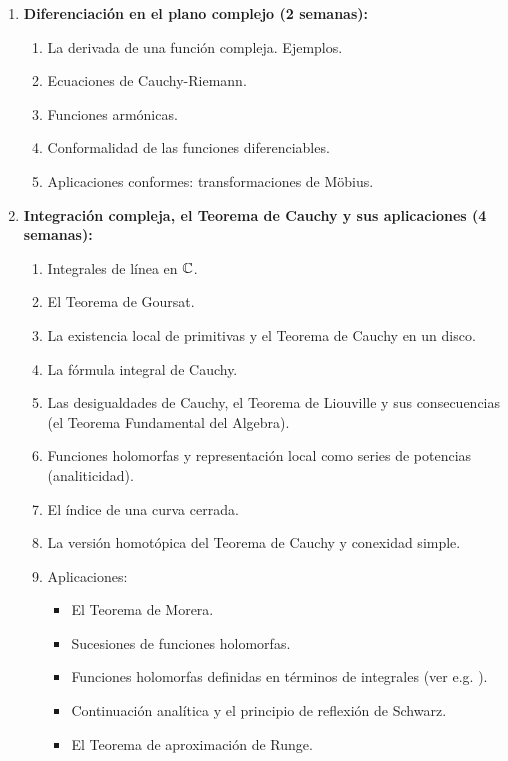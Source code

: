 \begin{refsection}
\begin{enumerate}
\begin{enumerate}
    \item Topología de $\C$: sucesiones, límites, abiertos y cerrados, compacidad, conexidad y arco-conexidad. 

    \item Funciones en el plano complejo: continuidad, convergencia uniforme.
    
    \item Series de potencias, sus discos de convergencia.
    
    \item Ejemplos de funciones analíticas: exponenciales y  trigonométricas.
\end{enumerate}

\item \textbf{Diferenciación en el plano complejo (2 semanas):} 
\begin{enumerate}
    \item La derivada de una función compleja. Ejemplos.
    \item Ecuaciones de Cauchy-Riemann. 
    \item Funciones armónicas.
    \item Conformalidad de las funciones diferenciables.
    \item Aplicaciones conformes: transformaciones de Möbius.
\end{enumerate}

\item \textbf{Integración compleja, el Teorema de Cauchy y sus aplicaciones (4 semanas):} 
\begin{enumerate}
    \item Integrales de línea en $\C$.
    \item El Teorema de Goursat.
    \item La existencia local de primitivas y el Teorema de Cauchy en un disco.
    \item La fórmula integral de Cauchy.
    \item Las desigualdades de Cauchy, el Teorema de Liouville y sus consecuencias (el Teorema Fundamental del Algebra).
    \item Funciones holomorfas y representación local como series de potencias (analiticidad).
    \item El índice de una curva cerrada.
    \item La versión homotópica del Teorema de Cauchy y conexidad simple.
    \item Aplicaciones:
    \begin{itemize}
        \item El Teorema de Morera.
        \item Sucesiones de funciones holomorfas.
        \item Funciones holomorfas definidas en términos de integrales (ver e.g. \cite[\S 5.3]{Con78}).
        \item Continuación analítica y el principio de reflexión de Schwarz.
        \item El Teorema de aproximación de Runge.
    \end{itemize}
\end{enumerate}


\end{enumerate}
\end{refsection}

